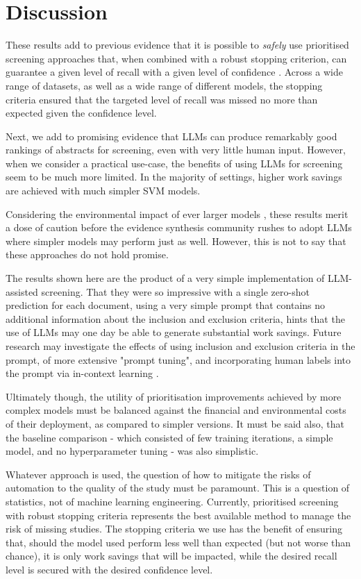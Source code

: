 \documentclass{article}
\begin{document}
	
	\section*{Discussion}
	
	These results add to previous evidence that it is possible to \textit{safely} use prioritised screening approaches that, when combined with a robust stopping criterion, can guarantee a given level of recall with a given level of confidence \cite{callaghan_statistical_2020}. Across a wide range of datasets, as well as a wide range of different models, the stopping criteria ensured that the targeted level of recall was missed no more than expected given the confidence level.
	
	Next, we add to promising evidence that LLMs can produce remarkably good rankings of abstracts for screening, even with very little human input. However, when we consider a practical use-case, the benefits of using LLMs for screening seem to be much more limited. In the majority of settings, higher work savings are achieved with much simpler SVM models.

    Considering the environmental impact of ever larger models \cite{luccioni_power_2024}, these results merit a dose of caution before the evidence synthesis community rushes to adopt LLMs where simpler models may perform just as well. However, this is not to say that these approaches do not hold promise. 
    
    The results shown here are the product of a very simple implementation of LLM-assisted screening. That they were so impressive with a single zero-shot prediction for each document, using a very simple prompt that contains no additional information about the inclusion and exclusion criteria, hints that the use of LLMs may one day be able to generate substantial work savings. Future research may investigate the effects of using inclusion and exclusion criteria in the prompt, of more extensive "prompt tuning", and incorporating human labels into the prompt via in-context learning \cite{dong_survey_2024}.

    Ultimately though, the utility of prioritisation improvements achieved by more complex models must be balanced against the financial and environmental costs of their deployment, as compared to simpler versions. It must be said also, that the baseline comparison - which consisted of few training iterations, a simple model, and no hyperparameter tuning - was also simplistic.

    Whatever approach is used, the question of how to mitigate the risks of automation to the quality of the study must be paramount. This is a question of statistics, not of machine learning engineering. Currently, prioritised screening with robust stopping criteria represents the best available method to manage the risk of missing studies. The stopping criteria we use has the benefit of ensuring that, should the model used perform less well than expected (but not worse than chance), it is only work savings that will be impacted, while the desired recall level is secured with the desired confidence level.
\end{document}
